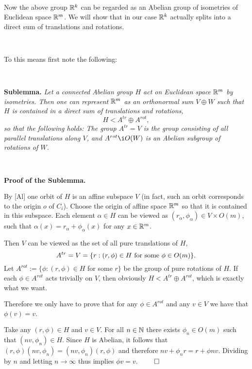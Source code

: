 \  

\
 
 
\vskip0.0in 
\hfil{}\hfil 
 
\ 

\

Now the above group ${\Bbb R}^k$ can be regarded as an Abelian group of isometries  
of Euclidean space ${\Bbb R}^m$.
We will show that in our case ${\Bbb R}^k$ actually
splits into a direct sum of translations and rotations.


\

To this means first note the following:

\
 
\noindent
{\bf Sublemma.\ts} 
{\sl Let a connected Abelian group $H$ act on Euclidean space
${\Bbb R}^m$ by isometries.  
Then one can represent ${\Bbb R}^m$ as an orthonormal sum $V\oplus W$ such that  
$H$ is contained in a direct sum of translations and rotations,
$$H<A^{tr}\oplus A^{rot},$$
so that the following holds:
The group $A^{tr}=V$ is the group 
consisting of all parallel translations along $V$, 
and $A^{rot}\i O(W)$ is an Abelian subgroup of rotations of $W$. 
}

\


\noindent
{\bf Proof of the Sublemma.}

By [Al] one orbit of $H$ is an affine subspace $V$
(in fact, such an orbit corresponds to the origin $o$ of $C_i$).
Choose the origin of 
affine space ${\Bbb R}^m$ so that it is contained in this subspace.
Each element $\alpha\in H$ can be viewed as 
$(r_\alpha,\phi_\alpha)\in V\times O(m)$, such that 
$\alpha(x)=r_\alpha+\phi_\alpha(x)$ for any
$x\in {\Bbb R}^m$.

Then $V$ can be viewed as the set of all pure translations of $H$,
$$A^{tr}=V=\{r:(r,\phi)\in H\ \hbox{for some}\  \phi\in O(m)\}.$$ 
Let $A^{rot}:=\{\phi:(r,\phi)\in H$ for some $r\}$ be the group of pure 
rotations of $H$.
If each $\phi\in A^{rot}$ acts trivially on $V$,
then obviously $H<A^{tr}\oplus A^{rot}$, which is exactly what we want.

Therefore we only have to prove that for any $\phi\in A^{rot}$ and any $v\in V$
we have that $\phi(v)=v$.

Take any $(r,\phi)\in H$ and $v\in V$. 
For all $n\in{\Bbb N}$ there exists $\phi_n\in O(m)$ such that 
$(nv,\phi_n)\in H$.
Since $H$ is Abelian, it follows that 
$(r,\phi)(nv,\phi_n)= (nv,\phi_n)(r,\phi)$ 
and therefore $nv+\phi_n r = r+\phi nv$. 
Dividing by $n$ and letting $n\to\infty$ thus implies
$\phi v = v$. $\qed$



